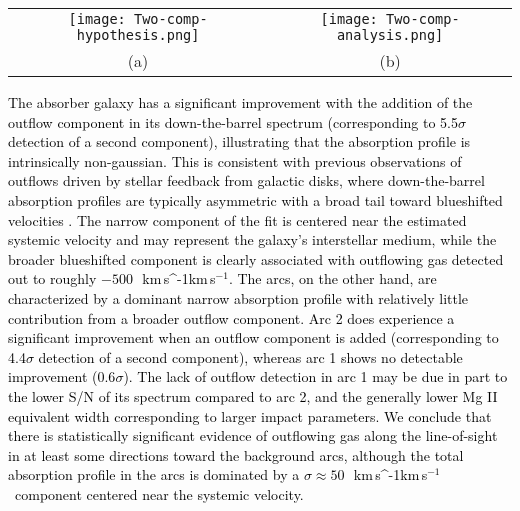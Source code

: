 \documentclass[twocolumn]{aastex62}
\newcommand{\MgII}{Mg\tiny{ }\footnotesize{II}\normalsize{ }}
\newcommand{\SiII}{Si\tiny{ }\footnotesize{II}\normalsize{ }}
\newcommand{\kms}{\ifmmode\,{\rm km}\,{\rm s}^{-1}\else km$\,$s$^{-1}$\fi}
\begin{document}
\begin{figure*}[htb!]
\begin{tabular}{cc}
    \texttt{[image: Two-comp-hypothesis.png]} & \texttt{[image: Two-comp-analysis.png]}\\
    \Large{\qquad(a)} & \Large{\qquad(b)}
  \end{tabular}
\caption{
\textcolor{black}{(\textbf{a}) Triple-gaussian profiles fitted to \MgII absorption lines of arc 2 (\textit{top}) and arc 1 (\textit{bottom}). Red shaded areas reveal underestimations in the absorption strength fit profiles, indicating the possible presence of a second kinematic component. (\textbf{b}) Two-component gaussian fits (black) to \MgII absorption lines of arc 2 (\textit{top}), the absorber galaxy (\textit{middle}), and arc 1 (\textit{bottom}). Magenta profiles indicate narrow \textcolor{black}{dispersion-supported} gas components and cyan profiles indicate broad outflow components. In all cases the spectra are spatially integrated for the arcs and absorber galaxy. 
The velocity axes in this figure are centered on \MgII $\lambda$2803 and not \MgII $\lambda$2796; we do not fit the $\lambda$2796 line in the background arcs due to blending with the arcs' strong \SiII $\lambda$1260 feature.}
} \label{fig:two_comp}
\end{figure*}

\textcolor{black}{The absorber galaxy has a significant improvement with the addition of the outflow component in its down-the-barrel spectrum (corresponding to 5.5$\sigma$ detection of a second component), illustrating that the absorption profile is intrinsically non-gaussian. This is consistent with previous observations of outflows driven by stellar feedback from galactic disks, where down-the-barrel absorption profiles are typically asymmetric with a broad tail toward blueshifted velocities \citep[e.g.,][]{Bouche2012, Bordoloi2014, Rubin2014, Schroetter2016}. 
The narrow component of the fit is centered near the estimated systemic velocity and may represent the galaxy's interstellar medium, while the broader blueshifted component is clearly associated with outflowing gas detected out to roughly $-500$~\kms. 
The arcs, on the other hand, are characterized by a dominant narrow absorption profile with relatively little contribution from a broader outflow component. Arc 2 does experience a significant improvement when an outflow component is added (corresponding to 4.4$\sigma$ detection of a second component), whereas arc 1 shows no detectable improvement (0.6$\sigma$). 
The lack of outflow detection in arc 1 may be due in part to the lower S/N of its spectrum compared to arc 2, and the generally lower \MgII equivalent width corresponding to larger impact parameters. 
We conclude that there is statistically significant evidence of outflowing gas along the line-of-sight in at least some directions toward the background arcs, although the total absorption profile in the arcs is dominated by a $\sigma \approx 50$~\kms\ component centered near the systemic velocity. 
} 
\end{document}
